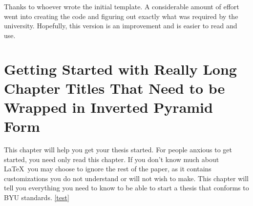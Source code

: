 \documentclass[12pt]{thesis}
\begin{document}
\begin{acknowledgements}
\qquad Thanks to whoever wrote the initial template. A considerable amount of effort went into creating the code and figuring out exactly what was required by the university. Hopefully, this version is an improvement and is easier to read and use.
\end{acknowledgements}


% 

\tableofcontents
\listoftables
\listoffigures

\mainmatter

\chapter{Getting Started with Really Long Chapter Titles That Need to be Wrapped in Inverted Pyramid Form}

This chapter will help you get your thesis started. For people anxious to get started, you need only read this chapter. If you don't know much about \LaTeX\ you may choose to ignore the rest of the paper, as it contains customizations you do not understand or will not wish to make. This chapter will tell you everything you need to know to be able to start a thesis that conforms to BYU standards. \ref{test}
\end{document}
